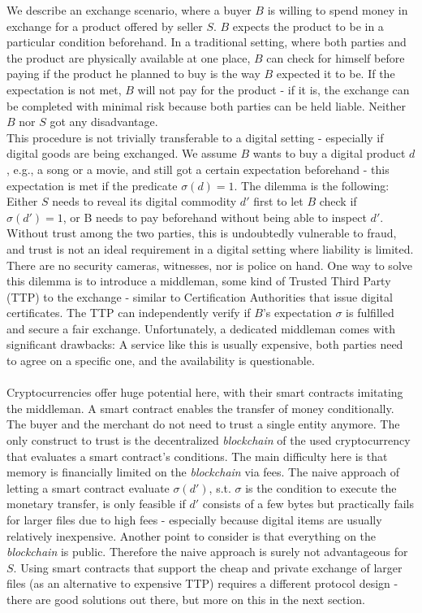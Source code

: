 \documentclass{cacthesis}
\newcounter{protocol}
\begin{document}
        We describe an exchange scenario, where a buyer $B$ is willing to spend money in exchange for a product offered by seller $S$. $B$ expects the product to be in a particular condition beforehand. In a traditional setting, where both parties and the product are physically available at one place, $B$ can check for himself before paying if the product he planned to buy is the way $B$ expected it to be. If the expectation is not met, $B$ will not pay for the product - if it is, the exchange can be completed with minimal risk because both parties can be held liable. Neither $B$ nor $S$ got any disadvantage. \\
        This procedure is not trivially transferable to a digital setting - especially if digital goods are being exchanged. We assume $B$ wants to buy a digital product $d$, e.g., a song or a movie, and still got a certain expectation beforehand - this expectation is met if the predicate $\sigma\left( d\right) =1$. The dilemma is the following: Either $S$ needs to reveal its digital commodity $d'$ first to let $B$ check if $\sigma\left( d'\right) =1$, or B needs to pay beforehand without being able to inspect $d'$. Without trust among the two parties, this is undoubtedly vulnerable to fraud, and trust is not an ideal requirement in a digital setting where liability is limited. There are no security cameras, witnesses, nor is police on hand. One way to solve this dilemma is to introduce a middleman, some kind of Trusted Third Party (TTP) to the exchange - similar to Certification Authorities that issue digital certificates. The TTP can independently verify if $B$'s expectation $\sigma$ is fulfilled and secure a fair exchange. Unfortunately, a dedicated middleman comes with significant drawbacks: A service like this is usually expensive, both parties need to agree on a specific one, and the availability is questionable. \\\\
        Cryptocurrencies offer huge potential here, with their smart contracts imitating the middleman. A smart contract enables the transfer of money conditionally. The buyer and the merchant do not need to trust a single entity anymore. The only construct to trust is the decentralized \textit{blockchain} of the used cryptocurrency that evaluates a smart contract's conditions. The main difficulty here is that memory is financially limited on the \textit{blockchain} via fees. The naive approach of letting a smart contract evaluate $\sigma\left( d'\right)$, s.t. $\sigma$ is the condition to execute the monetary transfer, is only feasible if $d'$ consists of a few bytes but practically fails for larger files due to high fees - especially because digital items are usually relatively inexpensive. Another point to consider is that everything on the \textit{blockchain} is public. Therefore the naive approach is surely not advantageous for $S$. Using smart contracts that support the cheap and private exchange of larger files (as an alternative to expensive TTP) requires a different protocol design - there are good solutions out there, but more on this in the next section.   \\ 
\end{document}

